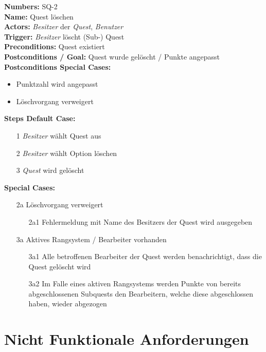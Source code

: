 \documentclass{article}
\begin{document}
\newpage

\begin{samepage}
	\textbf{Numbers:} SQ-2\\
	\textbf{Name:} Quest löschen\\
	\textbf{Actors:} \textit{Besitzer} der \textit{Quest}, \textit{Benutzer}\\
	\textbf{Trigger:} \textit{Besitzer} löscht (Sub-) Quest\\ 
	\textbf{Preconditions:} Quest existiert \\ 
	\textbf{Postconditions / Goal:} Quest wurde gelöscht / Punkte angepasst\\
	\textbf{Postconditions Special Cases:} 
	\begin{itemize}
		\item Punktzahl wird angepasst 
		\item Löschvorgang verweigert
	\end{itemize}
	\textbf{Steps Default Case:}
	\begin{itemize}
		\item[1] \textit{Besitzer} wählt Quest aus
		\item[2] \textit{Besitzer} wählt Option löschen
		\item[3] \textit{Quest} wird gelöscht 
	\end{itemize}
	\textbf{Special Cases:}
	\begin{itemize}
	\item [2a] Löschvorgang verweigert
	\begin{itemize}
		\item [2a1] Fehlermeldung mit Name des Besitzers der Quest wird ausgegeben 
	\end{itemize} 
	\item [3a] Aktives Rangsystem / Bearbeiter vorhanden
	\begin{itemize}
		\item [3a1] Alle betroffenen Bearbeiter der Quest werden benachrichtigt, dass die Quest gelöscht wird
		\item [3a2] Im Falle eines aktiven Rangsystems werden Punkte von bereits abgeschlossenen Subquests den Bearbeitern, welche diese abgeschlossen haben, wieder abgezogen
	\end{itemize}
	\end{itemize}
	\end{samepage}

\newpage
\section{Nicht Funktionale Anforderungen}
\end{document}
